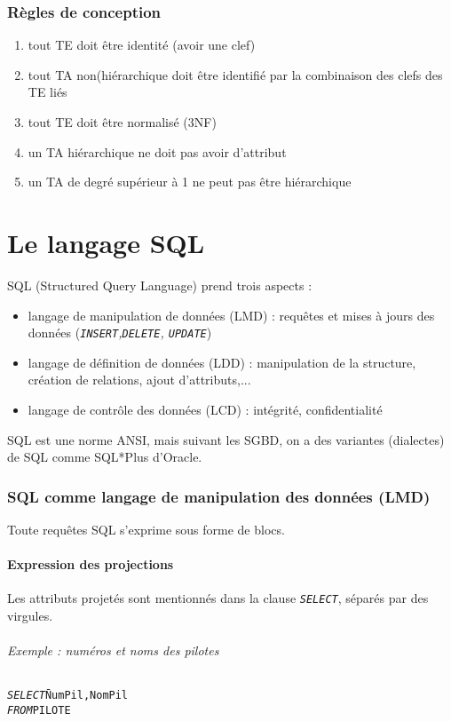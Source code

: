 \documentclass[10pt]{article}
\begin{document}
		\section{Règles de conception}
			\begin{enumerate}
				\item tout TE doit être identité (avoir une clef)
				\item tout TA non(hiérarchique doit être identifié par la combinaison des clefs des TE liés
				\item tout TE doit être normalisé (3NF)
				\item un TA hiérarchique ne doit pas avoir d'attribut
				\item un TA de degré supérieur à 1 ne peut pas être hiérarchique
			\end{enumerate}

\newpage
\part{Le langage SQL}
	SQL (Structured Query Language) prend trois aspects :
		\begin{itemize}
			\item langage de manipulation de données (LMD) : requêtes et mises à jours des données (\emph{\texttt{INSERT},\texttt{DELETE}, \texttt{UPDATE}})
			\item langage de définition de données (LDD) : manipulation de la structure, création de relations, ajout d'attributs,...
			\item langage de contrôle des données (LCD) : intégrité, confidentialité
		\end{itemize}
		
	SQL est une norme ANSI, mais suivant les SGBD, on a des variantes (dialectes) de SQL comme SQL*Plus d'Oracle.
	
	\section{SQL comme langage de manipulation des données (LMD)}
		Toute requêtes SQL s'exprime sous forme de blocs.
		
		\subsection{Expression des projections}
			Les attributs projetés sont mentionnés dans la clause \emph{\texttt{SELECT}}, séparés par des virgules.
			\paragraph{Exemple : numéros et noms des pilotes}
				\begin{alltt}
					\begin{tabbing}
						\emph{SELECT} \= NumPil, NomPil\\
						\emph{FROM} \> PILOTE
					\end{tabbing}
				\end{alltt}
				
\end{document}
